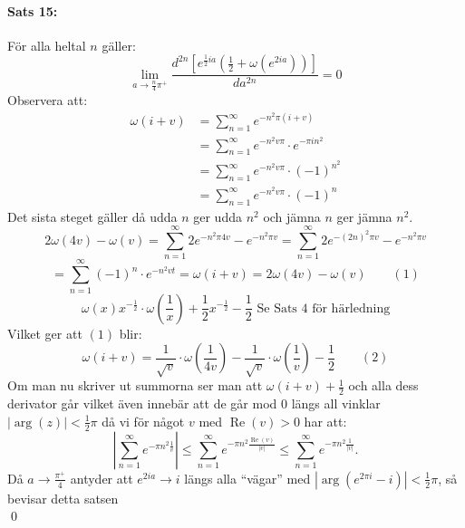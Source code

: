 \documentclass{article}%
\begin{document}
\paragraph{Sats 15:} För alla heltal $n$ gäller:
\[%
	\lim_{a \to \frac n 4 \pi^+} \frac {
		d^{2n} [
			e^{\frac 1 2 ia} (\frac 1 2 + \omega(e^{2ia}))
		]}
		{
			da^{2n}
		} = 0
\]
Observera att:
\begin{align*}
	\omega(i + v) &= \sum_{n = 1}^\infty e^{-n^2 \pi(i + v)} \\
		&= \sum_{n = 1}^\infty e^{-n^2 v \pi} \cdot e^{-\pi i n^2} \\
		&= \sum_{n = 1}^\infty e^{-n^2 v \pi} \cdot (- 1)^{n^2} \\
		&= \sum_{n = 1}^\infty e^{-n^2 v \pi} \cdot (- 1)^n
\end{align*}
Det sista steget gäller då udda $n$ ger udda $n^2$ och jämna $n$ ger jämna $n^2$.
\[
	2 \omega(4v) - \omega(v) = \sum_{n = 1}^\infty 2 e^{-n^2 \pi 4 v} - e^{-n^2 \pi v} = \sum_{n = 1}^\infty 2
		e^{-(2n)^2\pi v} - e^{-n^2 \pi v} 
\]
\[
	= \sum_{n = 1}^\infty (-1)^n \cdot e^{-n^2 vt} = \omega(i + v) = 2 \omega(4 v) -
			\omega(v) \qquad (1)
\]
\[
	\omega(x) x^{- \frac 1 2} \cdot \omega(\frac 1 x) + \frac 1 2  x^{- \frac 1 2} - \frac 1 2 \text{ Se Sats 4 för härledning}
\]
Vilket ger att $(1)$ blir:
\[
	\omega(i + v) = \frac {1} {\sqrt v} \cdot \omega(\frac {1} {4v}) - \frac {1} {\sqrt v} \cdot \omega(\frac 1 v) - \frac 1 2
		\qquad (2)
\]
Om man nu skriver ut summorna ser man att $\omega(i + v) + \frac 1 2$ och alla dess derivator går
vilket även innebär att de går mod $0$ längs all vinklar $|\operatorname{arg}(z)| < \frac 1 2 \pi$ då vi för något $v$ med 
$\operatorname{Re}(v) > 0$ har att:
\[
	\left |
		 \sum_{n = 1}^\infty e^{-\pi n^2 \frac 1 v} 
	\right | \leq 
		\sum_{n = 1}^\infty e^{-\pi n^2 \frac {\operatorname{Re}(v)} {|v|}}
	\leq
		\sum_{n = 1}^\infty e^{-\pi n^2 \frac {1} {|v|}}.
\]
Då $a \to \frac {\pi^+} {4}$ antyder att $e^{2ia} \to i$ längs alla ``vägar''
med $|\operatorname{arg}(e^{2\pi i} - i) | < \frac 1 2 \pi$, så bevisar detta satsen\\
\hfill \qed
\end{document}
